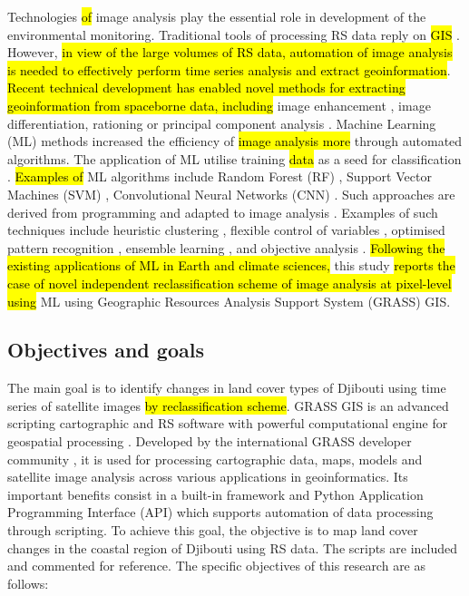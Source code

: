 \documentclass[jimaging,article,submit,pdftex,moreauthors]{Definitions/mdpi}
\begin{document}
Technologies \hl{of} {image analysis} play the essential role in development {of the environmental monitoring}. {Traditional tools of processing RS data reply on} \hl{GIS} \cite{BORANA2023261,Zhu02012021}. However, \hl{in view of the large volumes of RS data, automation of image analysis is needed to effectively perform time series analysis and extract geoinformation}. \hl{Recent technical development has enabled novel methods for extracting geoinformation from spaceborne data, including} image enhancement \cite{Dyson2024}, image differentiation, rationing or principal component analysis \cite{7877513}. Machine Learning (ML) methods increased the efficiency of \hl{image analysis more} through automated algorithms. The application of ML utilise training \hl{data} as a seed for classification \cite{FERCHICHI2024122211}. \hl{Examples of} ML algorithms include\hl{ }Random Forest (RF) \cite{Balha2022,Lemenkova202401}, {Support Vector Machines (SVM)} \cite{10450641}, {Convolutional Neural Networks (CNN)} \cite{SUAREZFERNANDEZ2024}. Such approaches are derived from programming and  adapted to\hl{ }image analysis\hl{ }\cite{HUANG2020104580,Arabameri}. Examples of such techniques include heuristic clustering \cite{8524429,10615674,669164,4666175}, flexible control of variables \cite{8999627}, optimised pattern recognition \cite{9708387,1634653}, ensemble learning \cite{10145147}, and objective analysis \cite{8938484,9279780}. \hl{Following the existing applications of ML in Earth and climate sciences, }this study \hl{reports the case of novel independent reclassification scheme of image analysis at pixel-level using} ML using Geographic Resources Analysis Support System (GRASS) GIS. 

\subsection{Objectives and goals}

The main goal{ }is to{ identify}{ changes in land cover types }of Djibouti using {time series of }satellite images \hl{by reclassification scheme}. {GRASS GIS is an advanced scripting cartographic and RS software with} powerful computational engine for geospatial processing \cite{NETELER2012124}. {Developed by the international GRASS developer community} \cite{grass_development_team_2025_14918754}, {it is used for processing cartographic data, maps, models and satellite image analysis across various applications in geoinformatics. Its important benefits consist in a built-in framework and Python Application Programming Interface (API) which supports automation of data processing through scripting.} To achieve this goal, the objective{ }is to map land cover changes in the coastal region of Djibouti{ }using RS data.{ }The{ }scripts are included and commented for{ }reference{. }The specific objectives of this research are as follows:
\end{document}
